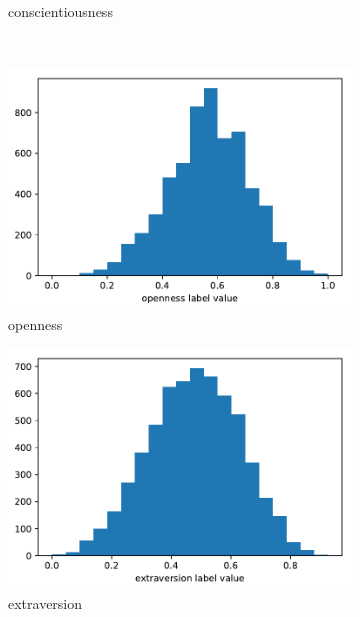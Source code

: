 \documentclass[12pt,a4paper]{report}
\begin{document}
\begin{figure}
\begin{subfigure}[b]{0.32\textwidth}
        \caption{conscientiousness}
        \label{fig:conscientiousness}
    \end{subfigure}
    ~ %
    \begin{subfigure}[b]{0.32\textwidth}
        \includegraphics[width=\textwidth]{imgs/openness_label_value.pdf}
        \caption{openness}
        \label{fig:openness}
    \end{subfigure}
    \begin{subfigure}[b]{0.32\textwidth}
        \includegraphics[width=\textwidth]{imgs/extraversion_label_value.pdf}
        \caption{extraversion}
        \label{fig:extraversion}
    \end{subfigure}
        \begin{subfigure}[b]{0.32\textwidth}

\end{subfigure}
\end{figure}
\end{document}
